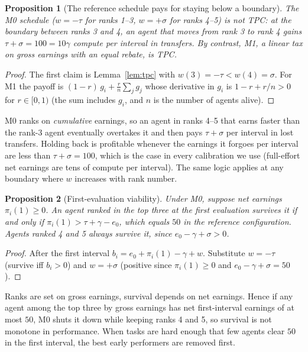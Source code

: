 \documentclass[11pt]{article}
\theoremstyle{plain}
\newtheorem{proposition}{Proposition}
\theoremstyle{remark}
\begin{document}
\begin{proposition}[The reference schedule pays for staying below a boundary]\label{prop:sandbag}
The M0 schedule ($w=-\tau$ for ranks 1--3, $w=+\sigma$ for ranks 4--5) is not TPC: at the boundary between ranks 3 and 4, an agent that moves from rank 3 to rank 4 gains $\tau+\sigma=100=10\gamma$ compute per interval in transfers. By contrast, M1, a linear tax on gross earnings with an equal rebate, is TPC.
\end{proposition}
\begin{proof}
The first claim is Lemma~\ref{lem:tpc} with $w(3)=-\tau<w(4)=\sigma$. For M1 the payoff is $(1-r)\,g_i+\frac{r}{n}\sum_j g_j$ whose derivative in $g_i$ is $1-r+r/n>0$ for $r\in[0,1)$ (the sum includes $g_i$, and $n$ is the number of agents alive).
\end{proof}

M0 ranks on \emph{cumulative} earnings, so an agent in ranks 4--5 that earns faster than the rank-3 agent eventually overtakes it and then pays $\tau+\sigma$ per interval in lost transfers. Holding back is profitable whenever the earnings it forgoes per interval are less than $\tau+\sigma=100$, which is the case in every calibration we use (full-effort net earnings are tens of compute per interval). The same logic applies at any boundary where $w$ increases with rank number.

\begin{proposition}[First-evaluation viability]\label{prop:viability}
Under M0, suppose net earnings $\pi_i(1)\ge0$. An agent ranked in the top three at the first evaluation survives it if and only if $\pi_i(1)>\tau+\gamma-e_0$, which equals $50$ in the reference configuration. Agents ranked 4 and 5 always survive it, since $e_0-\gamma+\sigma>0$.
\end{proposition}
\begin{proof}
After the first interval $b_i=e_0+\pi_i(1)-\gamma+w$. Substitute $w=-\tau$ (survive iff $b_i>0$) and $w=+\sigma$ (positive since $\pi_i(1)\ge0$ and $e_0-\gamma+\sigma=50$).
\end{proof}

Ranks are set on gross earnings, survival depends on net earnings. Hence if any agent among the top three by gross earnings has net first-interval earnings of at most $50$, M0 shuts it down while keeping ranks 4 and 5, so survival is not monotone in performance. When tasks are hard enough that few agents clear $50$ in the first interval, the best early performers are removed first.
\end{document}
